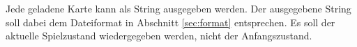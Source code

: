 Jede geladene Karte kann als String ausgegeben werden. Der ausgegebene String
soll dabei dem Dateiformat in Abschnitt \vref{sec:format} entsprechen. Es soll der
aktuelle Spielzustand wiedergegeben werden, nicht der Anfangszustand.
